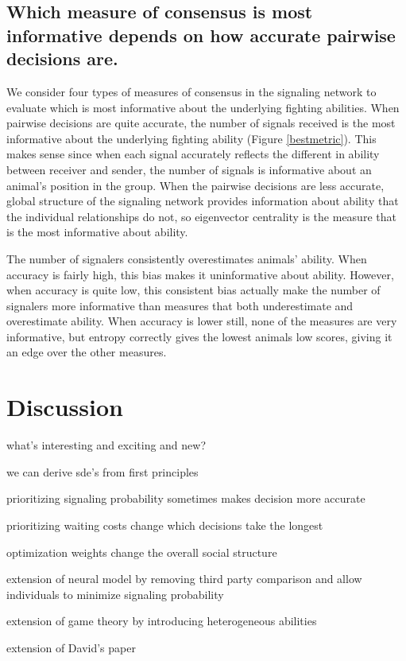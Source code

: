 \documentclass{article}
\begin{document}
\subsection{Which measure of consensus is most informative depends on how accurate pairwise decisions are. }
We consider four types of measures of consensus in the signaling network to evaluate which is most informative about the underlying fighting abilities.  When pairwise decisions are quite accurate, the number of signals received is the most informative about the underlying fighting ability (Figure \ref{bestmetric}).  This makes sense since when each signal accurately reflects the different in ability between receiver and sender, the number of signals is informative about an animal's position in the group.  When the pairwise decisions are less accurate, global structure of the signaling network provides information about ability that the individual relationships do not, so eigenvector centrality is the measure that is the most informative about ability.  

The number of signalers consistently overestimates animals' ability.  When accuracy is fairly high, this bias makes it uninformative about ability.  However, when accuracy is quite low, this consistent bias actually make the number of signalers more informative than measures that both underestimate and overestimate ability. When accuracy is lower still, none of the measures are very informative, but entropy correctly gives the lowest animals low scores, giving it an edge over the other measures.

\section{Discussion}
what's interesting and exciting and new?

we can derive sde's from first principles

prioritizing signaling probability sometimes makes decision more accurate

prioritizing waiting costs change which decisions take the longest

optimization weights change the overall social structure



extension of neural model by removing third party comparison and allow individuals to minimize signaling probability

extension of game theory by introducing heterogeneous abilities

extension of David's paper
\end{document}
